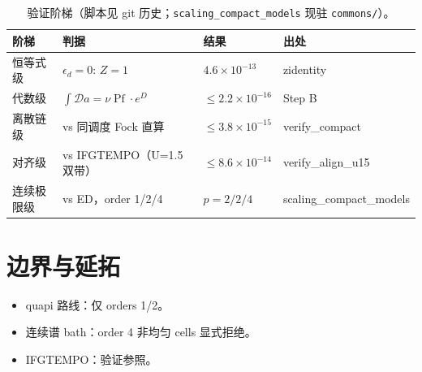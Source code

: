 \documentclass[11pt,a4paper]{ctexart}
\newcommand{\Pf}{\operatorname{Pf}}
\theoremstyle{plain}
\theoremstyle{definition}
\theoremstyle{remark}
\begin{document}
\begin{table}[htbp]
\centering
\begin{tabular}{llll}
\toprule
阶梯 & 判据 & 结果 & 出处 \\
\midrule
恒等式级 & $\epsilon_d = 0$: $Z = 1$ & $4.6\times10^{-13}$ & zidentity \\
代数级 & $\int\mathcal{D}a = \nu\Pf\cdot e^{D}$ & $\le 2.2\times10^{-16}$ & Step B \\
离散链级 & vs 同调度 Fock 直算 & $\le 3.8\times10^{-15}$ & verify\_compact \\
对齐级 & vs IFGTEMPO（U=1.5 双带） & $\le 8.6\times10^{-14}$ & verify\_align\_u15 \\
连续极限级 & vs ED，order 1/2/4 & $p = 2/2/4$ & scaling\_compact\_models \\
\bottomrule
\end{tabular}
\caption{验证阶梯（脚本见 git 历史；\texttt{scaling\_compact\_models} 现驻 \texttt{commons/}）。}
\end{table}

\section{边界与延拓}

\begin{itemize}
\item quapi 路线：仅 orders 1/2。
\item 连续谱 bath：order 4 非均匀 cells 显式拒绝。
\item IFGTEMPO：验证参照。
\end{itemize}
\end{document}
